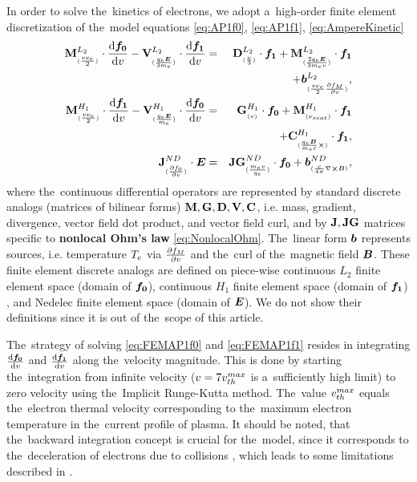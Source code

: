 In order to solve the~kinetics of electrons, we adopt a~high-order 
finite element discretization 
\cite{Dobrev_Kolev_Rieben-High-order_curvilinear_finite_element_methods_for_Lagrangian_hydrodynamics, mfem-library} 
of the~model equations \eqref{eq:AP1f0}, \eqref{eq:AP1f1}, 
\eqref{eq:AmpereKinetic}
\begin{eqnarray}
  \mathbf{M}^{L_2}_{_{(\frac{v\nu_{e}}{2})}}\cdot\frac{\text{d} \boldsymbol{f_0}}{\text{d} v} 
  - \mathbf{V}^{L_2}_{_{(\frac{q_e\boldsymbol{E}}{3m_e})}}\cdot\frac{\text{d} {\boldsymbol{f_1}}}{\text{d} v}
  &=&
  \mathbf{D}^{L_2}_{_{(\frac{v}{3})}}\cdot{\boldsymbol{f_1}} 
  + \mathbf{M}^{L_2}_{_{(\frac{2q_e\boldsymbol{E}}{3m_ev})}}\cdot{\boldsymbol{f_1}}
  \nonumber \\ 
  &&+ \boldsymbol{b}^{L_2}_{_{(\frac{v\nu_{e}}{2}\frac{\partial{f_M}}{\partial{v}})}}, 
  \label{eq:FEMAP1f0}
  \\
  \mathbf{M}^{H_1}_{_{(\frac{v\nu_{e}}{2})}}\cdot\frac{\text{d} {\boldsymbol{f_1}}}{\text{d} v}
  - \mathbf{V}^{H_1}_{_{(\frac{q_e\boldsymbol{E}}{m_e})}}\cdot\frac{\text{d} \boldsymbol{f_0}}{\text{d} v}
   &=& 
  \mathbf{G}^{H_1}_{_{(v)}}\cdot\boldsymbol{f_0} 
  + \mathbf{M}^{H_1}_{_{(\nu_{scat})}}\cdot{\boldsymbol{f_1}} 
  \nonumber \\
  && + \mathbf{C}^{H_1}_{_{(\frac{q_e\boldsymbol{B}}{m_e c}\boldsymbol{\times})}}\cdot{\boldsymbol{f_1}}
  ,
  \label{eq:FEMAP1f1}\\
  \mathbf{J}^{ND}_{_{(\frac{\partial{f_0}}{\partial{v}})}}\cdot\boldsymbol{E} 
  &=& 
  \mathbf{JG}^{ND}_{_{(\frac{m_ev}{q_e})}}\cdot\boldsymbol{f_0}
  + \boldsymbol{b}^{ND}_{_{(\frac{c}{4\pi} \nabla\boldsymbol{\times}\boldsymbol{B})}} 
  ,
  \nonumber \\
  \label{eq:FEMAmpereKinetic}
\end{eqnarray}
where the~continuous differential operators are represented by standard 
discrete analogs (matrices of bilinear forms) 
$\mathbf{M}, \mathbf{G}, \mathbf{D}, \mathbf{V}, \mathbf{C}$, i.e. mass, gradient, 
divergence, vector field dot product, and vector field curl, and
by $\mathbf{J}, \mathbf{JG}$ matrices specific to {\bf nonlocal Ohm's law} 
\eqref{eq:NonlocalOhm}. The~linear form $\boldsymbol{b}$ represents sources, i.e.
temperature $T_e$ via $\frac{\partial{f_M}}{\partial{v}}$ and the~curl of 
the~magnetic field $\boldsymbol{B}$. These finite element discrete analogs are defined
on piece-wise continuous $L_2$ finite element space (domain of $\boldsymbol{f_0}$),
continuous $H_1$ finite element space (domain of ${\boldsymbol{f_1}}$) 
\cite{Dobrev_Kolev_Rieben-High-order_curvilinear_finite_element_methods_for_Lagrangian_hydrodynamics}, 
and Nedelec finite element space (domain of $\boldsymbol{E}$). We do not show their
definitions since it is out of the~scope of this article. 

The~strategy of solving 
\eqref{eq:FEMAP1f0} and \eqref{eq:FEMAP1f1} resides in integrating 
$\frac{\text{d} \boldsymbol{f_0}}{\text{d} v}$
and $\frac{\text{d} {\boldsymbol{f_1}}}{\text{d} v}$ along the~velocity magnitude. 
This is done by starting the~integration
from infinite velocity ($v = 7 v_{th}^{max}$ is a~sufficiently high limit) 
to zero velocity using the~Implicit Runge-Kutta method. The~value
$v_{th}^{max}$ equals the~electron thermal velocity corresponding to the~maximum 
electron temperature in the~current profile of plasma.
It should be noted, that the~backward integration concept is crucial for 
the~model, since it corresponds to the~deceleration of electrons due to 
collisions \cite{Touati_2014}, which leads to some limitations described in 
. 

